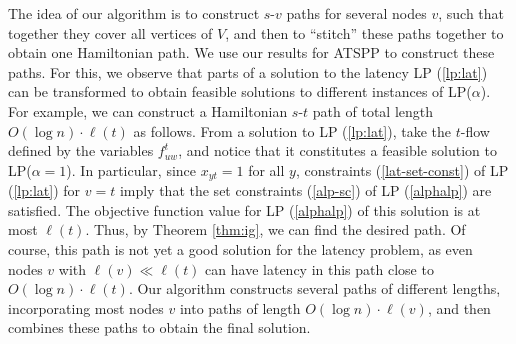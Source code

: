 \documentclass[11pt]{article}
\begin{document}
The idea of our algorithm is to construct $s$-$v$ paths for several nodes $v$, such that together they cover all vertices of $V$, and then to ``stitch'' these paths together to obtain one Hamiltonian path. We use our results for ATSPP to construct these paths.  For this, we observe that parts of a solution to the latency  LP (\ref{lp:lat}) can be transformed to obtain feasible solutions to different instances of 
LP($\alpha$).  For example, we can construct a Hamiltonian $s$-$t$ path of total length $O(\log n)\cdot \ell(t)$ as follows. From a solution to LP (\ref{lp:lat}), take the $t$-flow defined by the variables $f^t_{uw}$, and notice that it constitutes a feasible solution to LP($\alpha=1$). In particular, since $x_{yt}=1$ for all $y$, constraints (\ref{lat-set-const}) of LP (\ref{lp:lat}) for  $v=t$ imply that the set constraints (\ref{alp-sc}) of LP (\ref{alphalp}) are satisfied.  The objective function value for LP (\ref{alphalp}) of this solution is at most $\ell(t)$. Thus, by Theorem \ref{thm:ig}, we can find the desired path. Of course, this path is not yet a good solution for the latency problem, as even nodes $v$ with $\ell(v) \ll \ell(t)$ can have latency in this path close to $O(\log n) \cdot\ell(t)$.  Our algorithm constructs several paths of different lengths, incorporating most nodes $v$ into paths of length $O(\log n) \cdot \ell(v)$, and then combines these paths to obtain the final solution.
\end{document}
